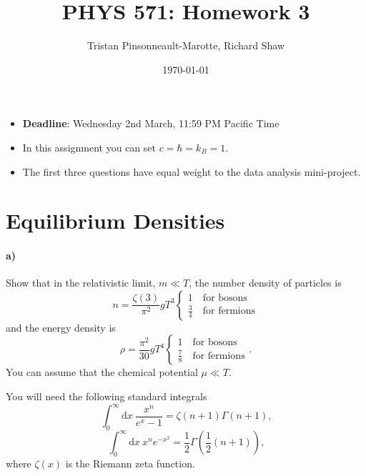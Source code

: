 \documentclass[12pt]{article}
\author{Tristan Pinsonneault-Marotte, Richard Shaw}
\title{PHYS 571: Homework 3}
\date{\today}
\newcommand\diff{\mathrm{d}}
\begin{document}
\maketitle

\begin{itemize}
    \item \textbf{Deadline}: Wednesday 2nd March, 11:59 PM Pacific Time
    \item In this assignment you can set $c = \hbar = k_B = 1$.
    \item The first three questions have equal weight to the data analysis mini-project.
\end{itemize}



\section{Equilibrium Densities}

\paragraph{a)} Show that in the relativistic limit, $m \ll T$, the number
density of particles is
\begin{equation}
    n = \frac{\zeta(3)}{\pi^2} g T^3
    \begin{cases}
        1 \quad \text{for bosons} \\
        \frac{3}{4} \quad \text{for fermions}
    \end{cases}
\end{equation}
and the energy density is
\begin{equation}
    \rho = \frac{\pi^2}{30} g T^4
    \begin{cases}
        1 \quad \text{for bosons} \\
        \frac{7}{8} \quad \text{for fermions}
    \end{cases}
    \text{.}
\end{equation}
You can assume that the chemical potential $\mu \ll T$.

You will need the following standard integrals
\begin{equation}
    \int_0^{\infty} \diff x~\frac{x^n}{e^x - 1} = \zeta(n + 1) \Gamma(n + 1) \text{,}
\end{equation}
\begin{equation}
    \int_0^{\infty} \diff x~x^n e^{-x^2} =
    \frac{1}{2} \Gamma\left( \frac{1}{2} (n + 1) \right) \text{,}
\end{equation}
where $\zeta(x)$ is the Riemann zeta function.
\end{document}

